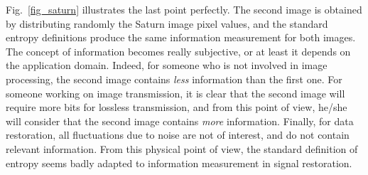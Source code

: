 Fig.~\ref{fig_saturn} illustrates the last point perfectly. 
The second image is obtained  by distributing randomly the Saturn image pixel 
values, and the standard entropy definitions  produce the same information
measurement for both images. The concept of information becomes really
subjective, or at least it depends on the application domain. Indeed, for 
someone who is
not involved in image processing, the second image contains 
{\em less} information
than the first one. For someone working on image transmission, it is clear
that the second image will require more bits for lossless transmission,
and from this point of view, he/she will consider that the second 
image contains
{\em more} information. Finally, for data restoration, all fluctuations
due to noise are not of interest, and do not contain relevant 
information. From this physical point of view, 
the standard  definition of entropy seems badly adapted to information 
measurement in signal restoration.

